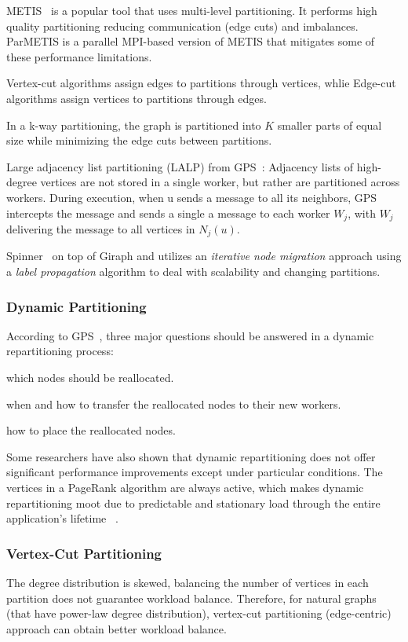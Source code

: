 \documentclass[UTF8,12pt,a4paper]{article}
\begin{document}
METIS~\cite{DBLP:conf/icpp/KarypisK95} is a popular tool that uses multi-level partitioning.
It performs high quality partitioning reducing communication (edge cuts) and imbalances.
ParMETIS is a parallel MPI-based version of METIS
that mitigates some of these performance limitations.

Vertex-cut algorithms assign edges to partitions through vertices,
whlie Edge-cut algorithms assign vertices to partitions through edges.

In a k-way partitioning, the graph is partitioned into $K$ smaller parts of equal size
while minimizing the edge cuts between partitions.

Large adjacency list partitioning (LALP) from GPS~\cite{DBLP:conf/ssdbm/SalihogluW13}:
Adjacency lists of high-degree vertices are not stored in a single worker,
but rather are partitioned across workers.
During execution, when u sends a message to all its neighbors,
GPS intercepts the message and sends a single a message to each worker $W_j$,
with $W_j$ delivering the message to all vertices in $N_j(u)$.

Spinner~\cite{DBLP:conf/icde/MartellaLLS17} on top of Giraph
and utilizes an \textit{iterative node migration} approach
using a \textit{label propagation} algorithm to
deal with scalability and changing partitions.
\subsubsection{Dynamic Partitioning}
According to GPS~\cite{DBLP:conf/ssdbm/SalihogluW13},
three major questions should be answered in a dynamic repartitioning process:
\begin{compactitem}
  \item which nodes should be reallocated.
  \item when and how to transfer the reallocated nodes to their new workers.
  \item how to place the reallocated nodes.
\end{compactitem}
Some researchers have also shown that
dynamic repartitioning does not offer significant performance improvements
except under particular conditions.
The vertices in a PageRank algorithm are always active,
which makes dynamic repartitioning moot
due to predictable and stationary load through the entire application’s lifetime
~\cite{DBLP:journals/csur/HeidariSCB18}.
\subsubsection{Vertex-Cut Partitioning}
The degree distribution is skewed,
balancing the number of vertices in each partition does not guarantee workload balance.
Therefore, for natural graphs (that have power-law degree distribution),
vertex-cut partitioning (edge-centric) approach can obtain better workload balance.
\end{document}
